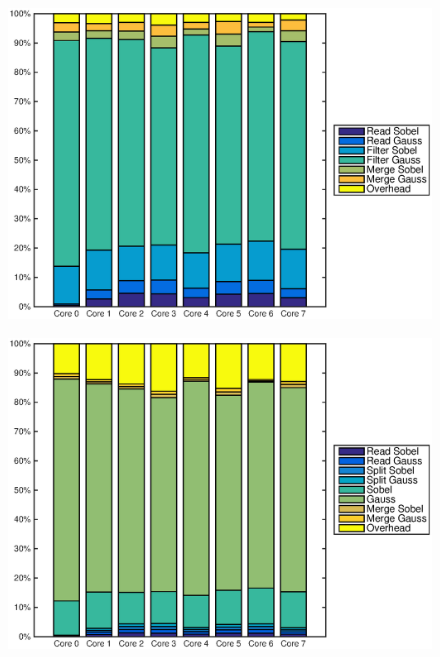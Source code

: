 \begin{figure}
    \centering
    \begin{minipage}{0.45\textwidth}
        \centering
        \includegraphics[width=0.99\linewidth]{images/openem_sobelqcif_gaussqcif_eo.eps}
        \label{fig:oem8coreeoqcif}
    \end{minipage}
    \hfill
    \begin{minipage}{0.45\textwidth}
        \centering
        \includegraphics[width=0.99\linewidth]{images/openem_sobelqcif_gaussqcif_func.eps}
        \label{fig:oem8corefuncqcif}
    \end{minipage}%
\end{figure}
